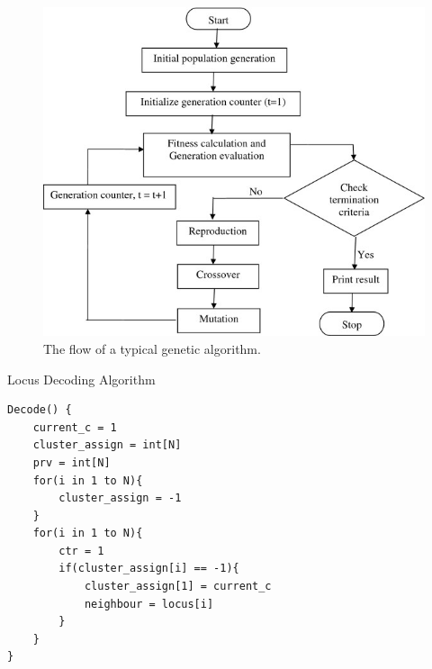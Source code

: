 \begin{figure}[!htb]
	\begin{center}
		\includegraphics[scale=.5]{images/genetic_typical.png}
	\end{center}
	\caption{The flow of a typical genetic algorithm.}
	\label{logo}
\end{figure}

\begin{table}[b]
\caption{Locus Decoding Algorithm}
\label{algorithmX}
\begin{verbatim}
Decode() {
    current_c = 1
    cluster_assign = int[N]
    prv = int[N]
    for(i in 1 to N){
        cluster_assign = -1
    }
    for(i in 1 to N){
        ctr = 1
        if(cluster_assign[i] == -1){
            cluster_assign[1] = current_c
            neighbour = locus[i]
        }
    }
}
\end{verbatim}
\end{table}
